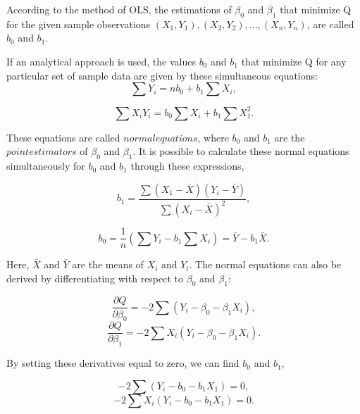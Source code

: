 \noindent According to the method of OLS, the estimations of $\beta_0$ and $\beta_1$ that minimize Q for the given sample observations $(X_1,Y_1), (X_2,Y_2), ..., (X_n,Y_n)$, are called $b_0$ and $b_1$.  

\noindent If an analytical approach is used, the values $b_0$ and $b_1$ that minimize Q for any particular set of sample data are given by these simultaneous equations: 
\begin{equation}
\sum Y_i =n b_0 +b_1 \sum X_i ,
\end{equation}

\begin{equation}
\sum X_i Y_i = b_0 \sum X_i + b_1 \sum X_1^2 .
\end{equation}

\noindent These equations are called $normal equations$, where $b_0$ and $b_1$ are the $point estimators$ of $\beta_0$ and $\beta_1$. It is possible to calculate these normal equations simultaneously for $b_0$ and $b_1$ through these expressions,

\begin{equation}
b_1 = \frac{\sum (X_1 - \bar{X}) (Y_i - \bar{Y})}{\sum (X_i - \bar{X})^2} ,
\end{equation}

\begin{equation}
	b_0 = \frac{1}{n} (\sum Y_i - b_1 \sum X_i ) = \bar{Y} - b_1 \bar{X} .
\end{equation}

\noindent Here, $\bar{X}$ and $\bar{Y}$ are the means of $X_i$ and $Y_i$. The normal equations can also be derived by differentiating with respect to $\beta_0$ and $\beta_1$:

\begin{equation}
	\frac{\partial Q}{\partial \beta_0}=-2 \sum (Y_i - \beta_0 - \beta_1 X_i) ,
\end{equation}
\begin{equation}
\frac{\partial Q} {\partial \beta_1} = -2 \sum X_i (Y_i - \beta_0 - \beta_1 X_i) .
\end{equation}

\noindent By setting these derivatives equal to zero, we can find $b_0$ and $b_1$, 

\begin{equation}
	-2 \sum (Y_i - b_0 - b_1 X_1)=0 ,
\end{equation}
\begin{equation}
	-2\sum X_i(Y_i - b_0 - b_1 X_1)=0 .
\end{equation}

